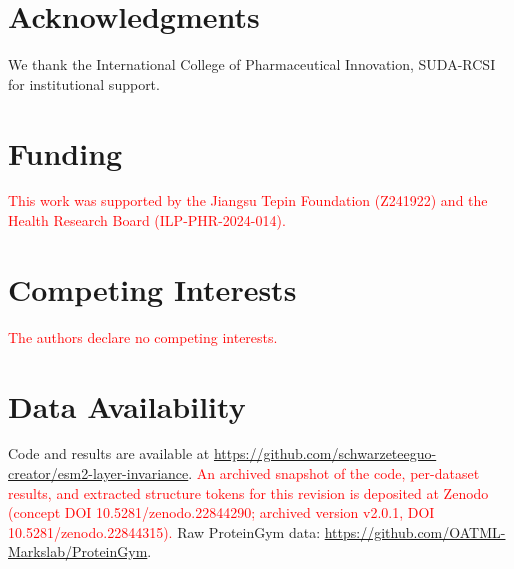 \documentclass[numbered,webpdf,modern,large]{oup-authoring-template}
\newcommand{\rev}[1]{\textcolor{red}{#1}}
\begin{document}
\section*{Acknowledgments}
We thank the International
College of Pharmaceutical Innovation, SUDA-RCSI for institutional support.

\section*{Funding}
\rev{This work was supported by the Jiangsu Tepin Foundation (Z241922) and
the Health Research Board (ILP-PHR-2024-014).}

\section*{Competing Interests}
\rev{The authors declare no competing interests.}

\section*{Data Availability}
Code and results are available at \url{https://github.com/schwarzeteeguo-creator/esm2-layer-invariance}.
\rev{An archived snapshot of the code, per-dataset results, and extracted
structure tokens for this revision is deposited at Zenodo (concept DOI
10.5281/zenodo.22844290; archived version v2.0.1, DOI 10.5281/zenodo.22844315).}
Raw ProteinGym data: \url{https://github.com/OATML-Markslab/ProteinGym}.
\end{document}
